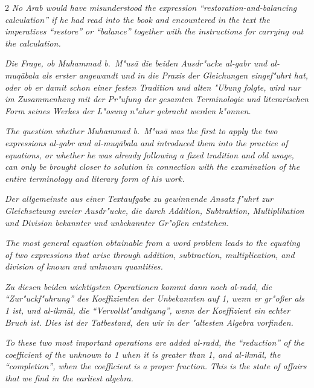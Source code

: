 \documentclass[10pt,a4paper]{article}
\newcommand{\enquote}[1]{``#1''}
\begin{document}
\begin{paracol}{2}
\textit{No Arab would have misunderstood the expression \enquote{restoration-and-balancing calculation} if he had read into the book and encountered in the text the imperatives \enquote{restore} or \enquote{balance} together with the instructions for carrying out the calculation.}

\switchcolumn*

\textit{Die Frage, ob Muhammad b.\ M"us\=a die beiden Ausdr"ucke \textit{al-gabr} und \textit{al-muq\=abala} als erster angewandt und in die Praxis der Gleichungen eingef"uhrt hat, oder ob er damit schon einer festen Tradition und alten "Ubung folgte, wird nur im Zusammenhang mit der Pr"ufung der gesamten Terminologie und literarischen Form seines Werkes der L"osung n"aher gebracht werden k"onnen.}

\switchcolumn

\textit{The question whether Muhammad b.\ M"us\=a was the first to apply the two expressions \textit{al-gabr} and \textit{al-muq\=abala} and introduced them into the practice of equations, or whether he was already following a fixed tradition and old usage, can only be brought closer to solution in connection with the examination of the entire terminology and literary form of his work.}

\switchcolumn*

\textit{Der allgemeinste aus einer Textaufgabe zu gewinnende Ansatz f"uhrt zur Gleichsetzung zweier Ausdr"ucke, die durch Addition, Subtraktion, Multiplikation und Division bekannter und unbekannter Gr"o\ss{}en entstehen.}

\switchcolumn

\textit{The most general equation obtainable from a word problem leads to the equating of two expressions that arise through addition, subtraction, multiplication, and division of known and unknown quantities.}

\switchcolumn*

\textit{Zu diesen beiden wichtigsten Operationen kommt dann noch \textit{al-radd}, die \enquote{Zur"uckf"uhrung} des Koeffizienten der Unbekannten auf 1, wenn er gr"o\ss{}er als 1 ist, und \textit{al-ikm\=al}, die \enquote{Vervollst"andigung}, wenn der Koeffizient ein echter Bruch ist. Dies ist der Tatbestand, den wir in der "altesten Algebra vorfinden.}

\switchcolumn

\textit{To these two most important operations are added \textit{al-radd}, the \enquote{reduction} of the coefficient of the unknown to 1 when it is greater than 1, and \textit{al-ikm\=al}, the \enquote{completion}, when the coefficient is a proper fraction. This is the state of affairs that we find in the earliest algebra.}


\end{paracol}
\end{document}
